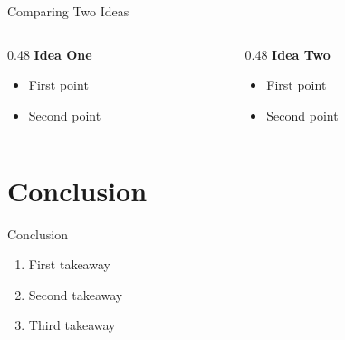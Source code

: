 \documentclass[11pt,aspectratio=169]{beamer}
\begin{document}
	\begin{frame}{Comparing Two Ideas}
		
		\begin{columns}
			
			\begin{column}{0.48\textwidth}
				\textbf{Idea One}
				\begin{itemize}
					\item First point
					\item Second point
				\end{itemize}
			\end{column}
			
			\begin{column}{0.48\textwidth}
				\textbf{Idea Two}
				\begin{itemize}
					\item First point
					\item Second point
				\end{itemize}
			\end{column}
			
		\end{columns}
		
	\end{frame}
	
	\section{Conclusion}
	
	\begin{frame}{Conclusion}
		
		\begin{enumerate}
			\item First takeaway
			\item Second takeaway
			\item Third takeaway
		\end{enumerate}
		
	\end{frame}
	
\end{document}
